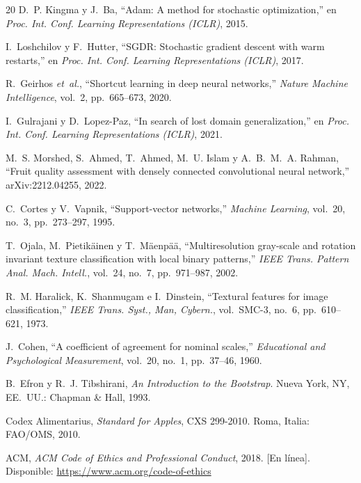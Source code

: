 \documentclass[conference,a4paper]{IEEEtran}
\begin{document}
\begin{thebibliography}{20}
 D.~P. Kingma y J.~Ba, ``Adam: A method for stochastic optimization,'' en \emph{Proc. Int. Conf. Learning Representations (ICLR)}, 2015.

 I.~Loshchilov y F.~Hutter, ``SGDR: Stochastic gradient descent with warm restarts,'' en \emph{Proc. Int. Conf. Learning Representations (ICLR)}, 2017.

 R.~Geirhos \emph{et~al.}, ``Shortcut learning in deep neural networks,'' \emph{Nature Machine Intelligence}, vol.~2, pp.~665--673, 2020.

 I.~Gulrajani y D.~Lopez-Paz, ``In search of lost domain generalization,'' en \emph{Proc. Int. Conf. Learning Representations (ICLR)}, 2021.

 M.~S. Morshed, S.~Ahmed, T.~Ahmed, M.~U. Islam y A.~B.~M.~A. Rahman, ``Fruit quality assessment with densely connected convolutional neural network,'' arXiv:2212.04255, 2022.

 C.~Cortes y V.~Vapnik, ``Support-vector networks,'' \emph{Machine Learning}, vol.~20, no.~3, pp.~273--297, 1995.

 T.~Ojala, M.~Pietikäinen y T.~Mäenpää, ``Multiresolution gray-scale and rotation invariant texture classification with local binary patterns,'' \emph{IEEE Trans. Pattern Anal. Mach. Intell.}, vol.~24, no.~7, pp.~971--987, 2002.

 R.~M. Haralick, K.~Shanmugam e I.~Dinstein, ``Textural features for image classification,'' \emph{IEEE Trans. Syst., Man, Cybern.}, vol.~SMC-3, no.~6, pp.~610--621, 1973.

 J.~Cohen, ``A coefficient of agreement for nominal scales,'' \emph{Educational and Psychological Measurement}, vol.~20, no.~1, pp.~37--46, 1960.

 B.~Efron y R.~J. Tibshirani, \emph{An Introduction to the Bootstrap}. Nueva York, NY, EE.~UU.: Chapman \& Hall, 1993.

 Codex Alimentarius, \emph{Standard for Apples}, CXS 299-2010. Roma, Italia: FAO/OMS, 2010.

 ACM, \emph{ACM Code of Ethics and Professional Conduct}, 2018. [En línea]. Disponible: \url{https://www.acm.org/code-of-ethics}

\end{thebibliography}
\end{document}
